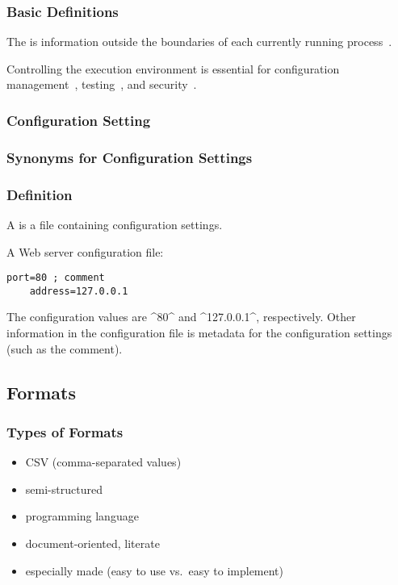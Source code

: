 \documentclass{beamer}
\begin{document}
\begin{frame}
	\frametitle{Basic Definitions}
	The  is information outside the boundaries of each currently running process~\cite{corbato1971multics}.

	Controlling the execution environment is essential for configuration management~\cite{cons2002pan,huang2015confvalley}, testing~\cite{van2010automating,wang2009context}, and security~\cite{goldberg1996secure,schreuders2012towards,perkins2009automatically,liang2003isolated}.
\end{frame}

\begin{frame}
	\frametitle{Configuration Setting}
	
\end{frame}


\begin{frame}[fragile]
	\frametitle{Synonyms for Configuration Settings}
\end{frame}

\begin{frame}[fragile]
	\frametitle{Definition}
	A  is a file containing configuration settings.

	\pause
	A Web server configuration file:

	\begin{lstlisting}[gobble=4]
	port=80 ; comment
	address=127.0.0.1\end{lstlisting}

	\pause

	The configuration values are ^80^ and ^127.0.0.1^, respectively.
	Other information in the configuration file is metadata for the configuration settings (such as the comment).
\end{frame}

\subsection{Formats}

\begin{frame}
	\frametitle{Types of Formats}
	\begin{itemize}
	\item CSV (comma-separated values)
	\item semi-structured
	\item programming language
	\item document-oriented, literate
	\item especially made (easy to use vs.\ easy to implement)
	\end{itemize}
\end{frame}
\end{document}
